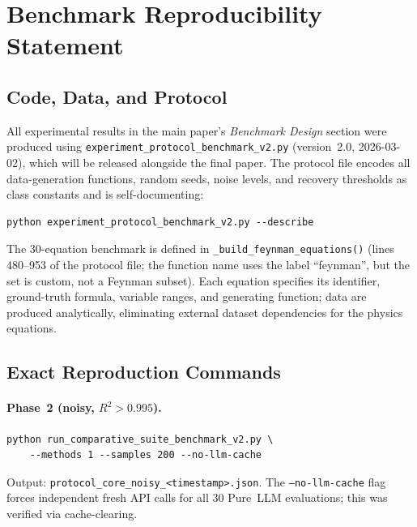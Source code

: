 \documentclass[twoside,11pt]{article}
\begin{document}
\section{Benchmark Reproducibility Statement}
\label{app:repro_statement}

\subsection*{Code, Data, and Protocol}

All experimental results in the main paper's \emph{Benchmark Design} section were produced
using \texttt{experiment\_protocol\_benchmark\_v2.py} (version~2.0,
2026-03-02), which will be released alongside the final paper.
The protocol file encodes all data-generation functions, random seeds, noise
levels, and recovery thresholds as class constants and is self-documenting:

\begin{verbatim}
python experiment_protocol_benchmark_v2.py --describe
\end{verbatim}

\noindent The 30-equation benchmark is defined in
\texttt{\_build\_feynman\_equations()} (lines 480--953 of the protocol file; the
function name uses the label ``feynman'', but the set is custom, not a Feynman subset).
Each equation specifies its identifier, ground-truth formula, variable
ranges, and generating function; data are produced analytically, eliminating
external dataset dependencies for the physics equations.

\subsection*{Exact Reproduction Commands}

\paragraph{Phase~2 (noisy, $R^2>0.995$).}
\begin{verbatim}
python run_comparative_suite_benchmark_v2.py \
    --methods 1 --samples 200 --no-llm-cache
\end{verbatim}
Output: \texttt{protocol\_core\_noisy\_<timestamp>.json}.
The \texttt{--no-llm-cache} flag forces independent fresh API calls for all
30 Pure~LLM evaluations; this was verified via cache-clearing.
\end{document}
